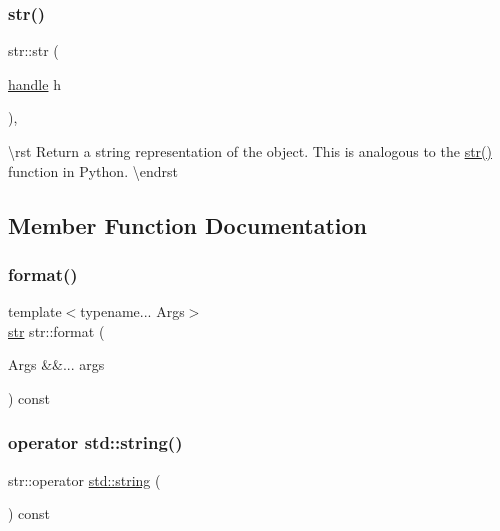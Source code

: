 \mbox{\label{classstr_a4bff3c112fa3379ba8a668ca1547b85a}} 
\subsubsection{\texorpdfstring{str()}{str()}\hspace{0.1cm}{\footnotesize\ttfamily [4/4]}}
{\footnotesize\ttfamily str\+::str (\begin{DoxyParamCaption}\item[{\mbox{\hyperlink{classhandle}{handle}}}]{h }\end{DoxyParamCaption})\hspace{0.3cm}{\ttfamily [inline]}, {\ttfamily [explicit]}}

\textbackslash{}rst Return a string representation of the object. This is analogous to the {\ttfamily \mbox{\hyperlink{classstr_a75cebb809550e845521f0a554452ddc3}{str()}}} function in Python. \textbackslash{}endrst 

\subsection{Member Function Documentation}
\mbox{\label{classstr_a2919bac4ba269742be227ecdf70249af}} 
\subsubsection{\texorpdfstring{format()}{format()}}
{\footnotesize\ttfamily template$<$typename... Args$>$ \\
\mbox{\hyperlink{classstr}{str}} str\+::format (\begin{DoxyParamCaption}\item[{Args \&\&...}]{args }\end{DoxyParamCaption}) const\hspace{0.3cm}{\ttfamily [inline]}}

\mbox{\label{classstr_af5512b70bfeba2a0f83d752f74501d4f}} 
\subsubsection{\texorpdfstring{operator std::string()}{operator std::string()}}
{\footnotesize\ttfamily str\+::operator \mbox{\hyperlink{_s_d_l__opengl__glext_8h_ab4ccfaa8ab0e1afaae94dc96ef52dde1}{std\+::string}} (\begin{DoxyParamCaption}{ }\end{DoxyParamCaption}) const\hspace{0.3cm}{\ttfamily [inline]}}



